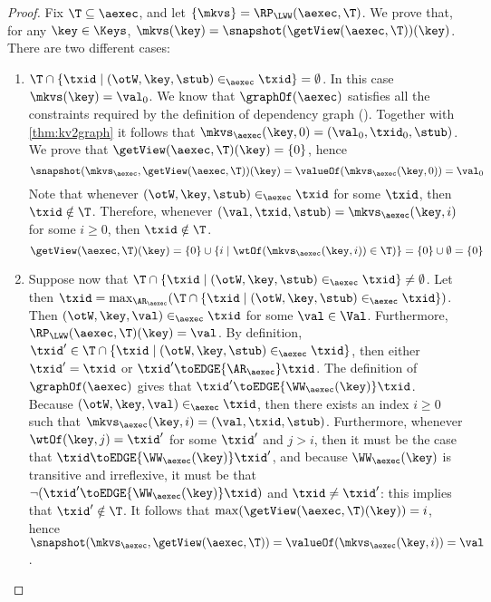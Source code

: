 \begin{proof}
Fix $\T \subseteq \aexec$, and let $\{\mkvs\} = \RP_{\LWW}(\aexec, \T)$. We prove that, for any $\key \in \Keys$, 
$\mkvs(\key) = \snapshot(\getView(\aexec, \T))(\key)$. There are two different cases: 
\begin{enumerate}
\item $\T \cap \{ \txid \mid (\otW, \key, \stub) \in_{\aexec} \txid \} = \emptyset$. 
In this case $\mkvs(\key) = \val_0$. 
We know that $\graphOf(\aexec)$ satisfies all the constraints required by the definition of dependency graph 
(\cite{laws}). Together with \cref{thm:kv2graph} it follows that $\mkvs_{\aexec}(\key, 0) = (\val_0, \txid_0, \stub)$.
We prove that $\getView(\aexec, \T)(\key) = \{0\}$, 
hence 
\[ 
\snapshot(\mkvs_{\aexec}, \getView(\aexec, \T))(\key) = \valueOf(\mkvs_{\aexec}(\key, 0)) = \val_{0}
\]
Note that whenever $(\otW, \key, \stub) \in_{\aexec} \txid$ for some $\txid$, then 
$\txid \notin \T$. Therefore, whenever $(\val, \txid, \stub) = \mkvs_{\aexec}(\key, i)$ for some $i \geq 0$, then 
$\txid \notin \T$.
\[
\getView(\aexec, \T)(\key) = \{0\} \cup \{i \mid \wtOf(\mkvs_{\aexec}(\key, i)) \in \T)\} = \{0\} \cup \emptyset = \{0\}
\]
\item Suppose now that $\T \cap \{ \txid \mid (\otW, \key, \stub) \in_{\aexec} \txid \} \neq \emptyset$. 
Let then $\txid = \max_{\AR_{\aexec}}(\T \cap \{\txid \mid (\otW, \key, \stub) \in_{\aexec} \txid\})$. 
Then $(\otW, \key, \val) \in_{\aexec} \txid$ for some $\val \in \Val$. Furthermore, $\RP_{\LWW}(\aexec, \T)(\key) = \val$.
By definition, $\txid' \in \T \cap \{ \txid \mid (\otW, \key, \stub) \in_{\aexec} \txid\}$, 
then either $\txid' = \txid$ or $\txid' \toEDGE{\AR_{\aexec}} \txid$. The definition of 
$\graphOf(\aexec)$ gives that $\txid' \toEDGE{\WW_{\aexec}(\key)} \txid$. 
Because $(\otW, \key, \val) \in_{\aexec} \txid$, then there exists an index 
$i \geq 0$ such that $\mkvs_{\aexec}(\key, i) = (\val, \txid, \stub)$. Furthermore, 
whenever $\wtOf(\key, j) = \txid'$ for some $\txid'$ and $j > i$, then it must 
be the case that $\txid \toEDGE{\WW_{\aexec}(\key)} \txid'$, and because 
$\WW_{\aexec}(\key)$ is transitive and irreflexive, it must be that  
$\neg( \txid' \toEDGE{\WW_{\aexec}(\key)} \txid)$ and $\txid \neq \txid'$: this implies that 
$\txid' \notin \T$. It follows that $\max(\getView(\aexec, \T)(\key)) = i$, hence 
$\snapshot(\mkvs_{\aexec}, \getView(\aexec, \T)) = \valueOf(\mkvs_{\aexec}(\key, i)) = \val$.
\end{enumerate}
\end{proof}

